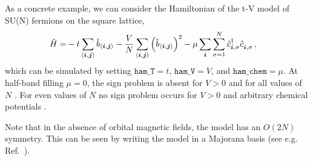 As a concrete example, we can consider the Hamiltonian of the t-V model of SU(N) fermions on the square lattice,
\begin{align}
\hat{H}= & -t \sum_{\langle \ve{i}, \ve{j} \rangle}  \hat{b}_{\langle \ve{i}, \ve{j} \rangle}
- \frac{V}{N} \sum_{\langle \ve{i}, \ve{j} \rangle}  \left(  \hat{b}_{\langle \ve{i}, \ve{j} \rangle}  \right)^2   - \mu \sum_{\ve{i}}  \sum_{\sigma =1}^{N} \hat{c}^{\dagger}_{\vec{i},\sigma } \hat{c}^{\phantom\dagger}_{\vec{i},\sigma } \,,
\end{align} 
which can be simulated by setting $\texttt{ham\_T}=t$, $\texttt{ham\_V} = V$, and $\texttt{ham\_chem}=\mu$.
At half-band filling $\mu =0$, the sign problem is absent for $V>0$ and for all values of $N$ \cite{Huffman14,Li16}.  For even values of $N$ no sign problem occurs for $V>0$ and arbitrary chemical potentials \cite{Wu04}.   

Note  that  in the absence of orbital magnetic fields,  the model has an $O(2N)$ symmetry. This can be seen by writing the model in a Majorana basis (see e.g. Ref.~\cite{Assaad16}). 










